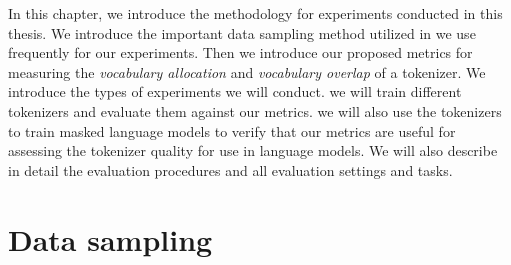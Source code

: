 In this chapter, we introduce the methodology for experiments conducted in this thesis. We introduce the important data sampling method utilized in \citet{devlin_bert_2019,conneau_unsupervised_2020} we use frequently for our experiments.
Then we introduce our proposed metrics for measuring the \textit{vocabulary allocation} and \textit{vocabulary overlap} of a tokenizer. 
We introduce the types of experiments we will conduct. 
 we will train different tokenizers and evaluate them against our metrics.
 we will also use the tokenizers to train masked language models to verify that our metrics are useful for assessing the tokenizer quality for use in language models. We will also describe in detail the evaluation procedures and all evaluation settings and tasks. 





\section{Data sampling}
\label{sec:data_sampling}



